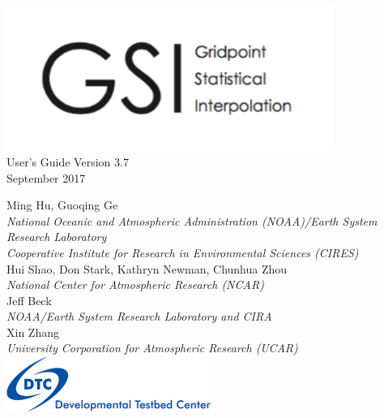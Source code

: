 \begin{titlepage}
{}
\noindent
   \begin{center}     

      \includegraphics[width=0.8\textwidth]{images/GSIbanner.png}\\[2em]
     {\color{darkcerulean}
        \Huge{User's Guide Version 3.7}\\[1em]       
        \normalsize{September 2017}\\[5em] 
       }
 
      \normalsize{Ming Hu, Guoqing Ge}\\ 
      \textit{\small{National Oceanic and Atmospheric Administration (NOAA)/Earth System Research Laboratory}}\\
      \textit{\small{Cooperative Institute for Research in Environmental Sciences (CIRES)}}\\[2em]
      \normalsize{Hui Shao, Don Stark, Kathryn Newman, Chunhua Zhou}\\
      \textit{\small{National Center for Atmospheric Research (NCAR)}}\\[2em]
      \normalsize{Jeff Beck}\\
      \textit{\small{NOAA/Earth System Research Laboratory and CIRA}}\\[2em]   
      \normalsize{Xin Zhang}\\
      \textit{\small{University Corporation for Atmospheric Research (UCAR)}}\\[2em]
 
       \includegraphics[width=0.5\textwidth]{images/DTClogo.png}\\
         
      \vspace{1em}

   \end{center}
   \restoregeometry
\end{titlepage}
\pagebreak{}




